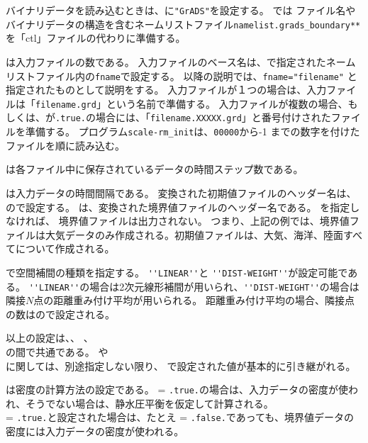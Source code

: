 バイナリデータを読み込むときは、に\verb|"GrADS"|を設定する。
\scalerm では ファイル名やバイナリデータの構造を含むネームリストファイル\verb|namelist.grads_boundary**|を「ctl」ファイルの代わりに準備する。

は入力ファイルの数である。
入力ファイルのベース名は、で指定されたネームリストファイル内の\verb|fname|で設定する。
以降の説明では、\verb|fname="filename"| と指定されたものとして説明をする。
入力ファイルが１つの場合は、入力ファイルは「\verb|filename.grd|」という名前で準備する。
入力ファイルが複数の場合、もしくは、が\verb|.true.|の場合には、「\verb|filename.XXXXX.grd|」と番号付けされたファイルを準備する。
プログラム\verb|scale-rm_init|は、\verb|00000|から-1 までの数字を付けたファイルを順に読み込む。

は各ファイル中に保存されているデータの時間ステップ数である。

は入力データの時間間隔である。
変換された初期値ファイルのヘッダー名は、ので設定する。
は、変換された境界値ファイルのヘッダー名である。
を指定しなければ、 境界値ファイルは出力されない。
つまり、上記の例では、境界値ファイルは大気データのみ作成される。初期値ファイルは、大気、海洋、陸面すべてについて作成される。


で空間補間の種類を指定する。
\verb|''LINEAR''|と \verb|''DIST-WEIGHT''|が設定可能である。
\verb|''LINEAR''|の場合は2次元線形補間が用いられ、\verb|''DIST-WEIGHT''|の場合は隣接$N$点の距離重み付け平均が用いられる。
距離重み付け平均の場合、隣接点の数はので設定される。

以上の設定は、、
、\\
の間で共通である。
や \\
に関しては、別途指定しない限り、
で設定された値が基本的に引き継がれる。
%

は密度の計算方法の設定である。
 = \verb|.true.|の場合は、入力データの密度が使われ、そうでない場合は、静水圧平衡を仮定して計算される。\\
 = \verb|.true.|と設定された場合は、たとえ = \verb|.false.|であっても、境界値データの密度には入力データの密度が使われる。

